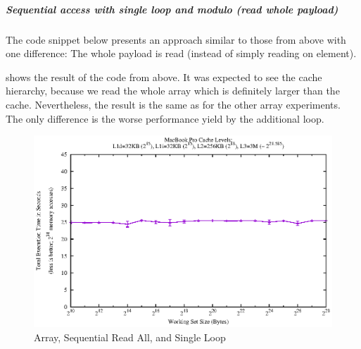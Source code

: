 \hypertarget{sequential-access-with-single-loop-and-modulo-read-whole-payload}{\subparagraph{Sequential
access with single loop and modulo (read whole
payload)}\label{sequential-access-with-single-loop-and-modulo-read-whole-payload}}

The code snippet below presents an approach similar to those from above
with one difference: The whole payload is read (instead of simply
reading on element).

\begin{Shaded}
\end{Shaded}

 shows the result of the code from above. It was
expected to see the cache hierarchy, because we read the whole array
which is definitely larger than the cache. Nevertheless, the result is
the same as for the other array experiments. The only difference is the
worse performance yield by the additional loop.

\begin{figure}[htbp]
\centering
\includegraphics{appendix/plots-cache-measurements/plot-array-modulo-seq-read-all}
\caption{Array, Sequential Read All, and Single Loop}
\label{app:array-seqreadall-sl}
\end{figure}

